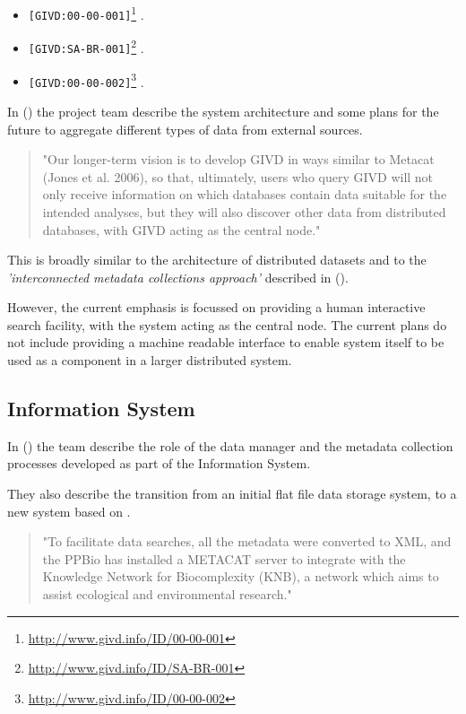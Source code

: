 \documentclass{article}
\begin{document}
\begin{itemize}
    \item \texttt{[GIVD:00-00-001]}\footnote{\url{http://www.givd.info/ID/00-00-001}} \cite{forest-plots}.
    \item \texttt{[GIVD:SA-BR-001]}\footnote{\url{http://www.givd.info/ID/SA-BR-001}} \cite{ppbio}.
    \item \texttt{[GIVD:00-00-002]}\footnote{\url{http://www.givd.info/ID/00-00-002}} \cite{team}.
\end{itemize}

In  (\cite{dengler-2011}) the \cite{givd} project
team describe the system architecture and some plans for the future to
aggregate different types of data from external sources.

\begin{quote}
"Our longer-term vision is to develop GIVD in ways similar to Metacat
(Jones et al. 2006), so that, ultimately, users who query GIVD will not
only receive information on which databases contain data suitable for the
intended analyses, but they will also discover other data from distributed
databases, with GIVD acting as the central node."
\end{quote}

This is broadly similar to the \cite{vo} architecture of distributed datasets
and to the \textit{'interconnected metadata collections approach'} described
in  (\cite{jones-2006}).

However, the current emphasis is focussed on providing a human interactive
search facility, with the \cite{givd} system acting as the central node.
The current plans do not include providing a machine readable
\cite{web-service} interface to enable \cite{givd} system itself to be used
as a component in a larger distributed system.

\subsection{\cite{ppbio} Information System}

In  (\cite{pezzini-2012}) the \cite{ppbio} team
describe the role of the data manager and the metadata collection processes
developed as part of the \cite{ppbio} Information System.

They also describe the transition from an initial flat file data storage
system, to a new system based on \cite{metacat}.

\begin{quote}
"To facilitate data searches, all the metadata were converted to XML, and
the PPBio has installed a METACAT server to integrate with the Knowledge
Network for Biocomplexity (KNB), a network which aims to assist ecological
and environmental research."
\end{quote}
\end{document}

